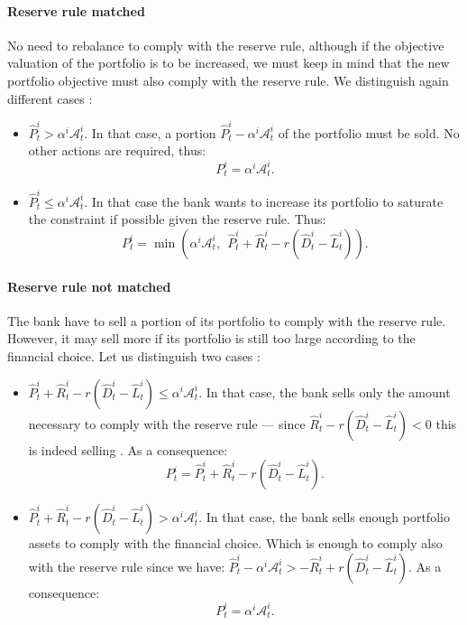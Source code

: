 \documentclass{article}
\newcommand{\wh}{\widehat}
\begin{document}
\paragraph{Reserve rule matched}
No need to rebalance to comply with the reserve rule, although if the objective valuation of the portfolio is to be increased, we must keep in mind that the new portfolio objective must also comply with the reserve rule.
We distinguish again different cases : 
\begin{itemize}
    \item $\widehat{P}_t^i > \alpha^i \mathcal{A}_t^i$. In that case, a portion $\widehat{P}_t^i - \alpha^i \mathcal{A}_t^i$ of the portfolio must be sold. No other actions are required, thus:
     $$P_t^i = \alpha^i \mathcal{A}_t^i.$$
    \item $\widehat{P}_t^i \leq \alpha^i \mathcal{A}_t^i$. In that case the bank wants to increase its portfolio to saturate the constraint if possible given the reserve rule. Thus: $$P_t^{i} = \min \left(\alpha^i \mathcal{A}_t^i,~~\widehat{P}_t^i + \widehat{R}_t^i - r(\wh D_t^i - \wh L_t^i) \right).$$
\end{itemize}

\paragraph{Reserve rule not matched}
The bank have to sell a portion of its portfolio to comply with the reserve rule. However, it may sell more if its portfolio is still too large according to the financial choice. Let us distinguish two cases :
\begin{itemize}
    \item $\widehat{P}_t^i + \widehat{R}_t^i - r(\wh D_t^i - \wh L_t^i) \leq \alpha^i \mathcal{A}_t^i$. In that case, the bank sells only the amount necessary to comply with the reserve rule --- since $\widehat{R}_t^i - r(\wh D_t^i - \wh L_t^i) < 0$ this is indeed selling . As a consequence: 
    $$ P_t^{i} = \widehat{P}_t^i + \widehat{R}_t^i - r(\wh D_t^i - \wh L_t^i).$$
    \item $\widehat{P}_t^i + \widehat{R}_t^i - r(\wh D_t^i - \wh L_t^i) > \alpha^i \mathcal{A}_t^i$. In that case, the bank sells enough portfolio assets to comply with the financial choice. Which is enough to comply also with the reserve rule since we have: $\widehat{P}_t^i - \alpha^i \mathcal{A}_t^i > - \widehat{R}_t^i + r(\wh D_t^i - \wh L_t^i) $. As a consequence: 
    $$ P_t^i = \alpha^i \mathcal{A}_t^i.$$
    
\end{itemize}
\end{document}
